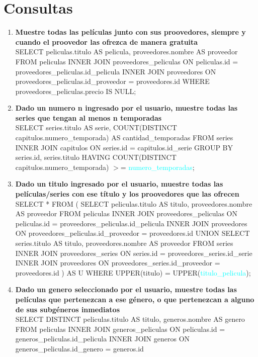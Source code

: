 \documentclass{article}
\begin{document}
\section{Consultas}
\begin{enumerate}
    \item \textbf{Muestre todas las películas junto con sus proovedores, siempre y cuando el proovedor las ofrezca de manera gratuita} \\
    SELECT peliculas.titulo AS pelicula, proveedores.nombre AS proveedor FROM peliculas
    INNER JOIN proveedores\_peliculas ON peliculas.id = proveedores\_peliculas.id\_pelicula
    INNER JOIN proveedores ON proveedores\_peliculas.id\_proveedor = proveedores.id
    WHERE proveedores\_peliculas.precio IS NULL;
    \item \textbf{Dado un numero n ingresado por el usuario, muestre todas las series que tengan al menos n temporadas} \\
    SELECT series.titulo AS serie, COUNT(DISTINCT capitulos.numero\_temporada) AS cantidad\_temporadas FROM series
    INNER JOIN capitulos ON series.id = capitulos.id\_serie
    GROUP BY series.id, series.titulo
    HAVING COUNT(DISTINCT capitulos.numero\_temporada) $>$= \textcolor{cyan}{numero\_temporadas};
    \item \textbf{Dado un titulo ingresado por el usuario, muestre todas las películas/series con ese título y los proovedores que las ofrecen} \\
    SELECT * FROM (
        SELECT peliculas.titulo AS titulo, proveedores.nombre AS proveedor FROM peliculas
        INNER JOIN proveedores\_peliculas ON peliculas.id = proveedores\_peliculas.id\_pelicula
        INNER JOIN proveedores ON proveedores\_peliculas.id\_proveedor = proveedores.id
        UNION
        SELECT series.titulo AS titulo, proveedores.nombre AS proveedor FROM series
        INNER JOIN proveedores\_series ON series.id = proveedores\_series.id\_serie
        INNER JOIN proveedores ON proveedores\_series.id\_proveedor = proveedores.id
    ) AS U WHERE UPPER(titulo) = UPPER(\textcolor{cyan}{titulo\_pelicula});
    \item \textbf{Dado un genero seleccionado por el usuario, muestre todas las películas que pertenezcan a ese género, o que pertenezcan a alguno de sus subgéneros inmediatos} \\
    SELECT DISTINCT peliculas.titulo AS titulo, generos.nombre AS genero FROM peliculas
    INNER JOIN generos\_peliculas ON peliculas.id = generos\_peliculas.id\_pelicula
    INNER JOIN generos ON generos\_peliculas.id\_genero = generos.id

\end{enumerate}
\end{document}

